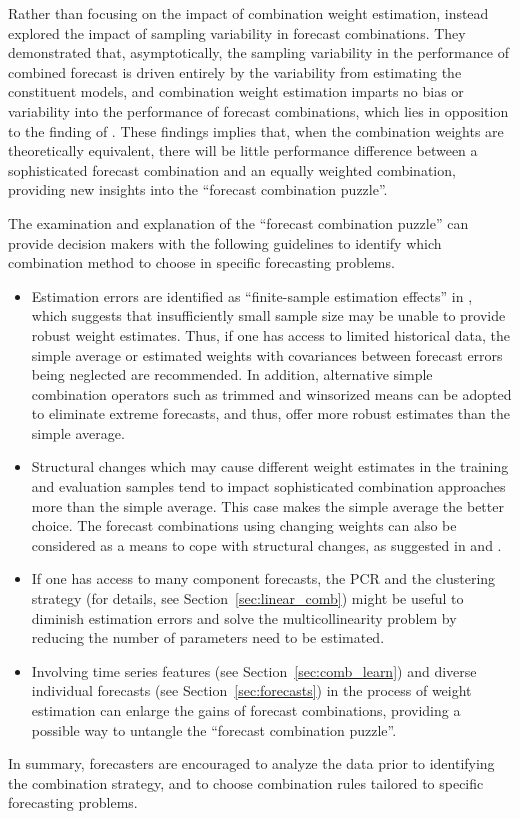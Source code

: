 \documentclass[a4paper,11pt]{article}
\begin{document}
Rather than focusing on the impact of combination weight estimation, \citet{Zischke2022-sv} instead explored the impact of sampling variability in forecast combinations. They demonstrated that, asymptotically, the sampling variability in the performance of combined forecast is driven entirely by the variability from estimating the constituent models, and combination weight estimation imparts no bias or variability into the performance of forecast combinations, which lies in opposition to the finding of \citet{Claeskens2016-pv}. These findings implies that, when the combination weights are theoretically equivalent, there will be little performance difference between a sophisticated forecast combination and an equally weighted combination, providing new insights into the ``forecast combination puzzle''.

The examination and explanation of the ``forecast combination puzzle'' can provide decision makers with the following guidelines to identify which combination method to choose in specific forecasting problems.
\begin{itemize}
  \item Estimation errors are identified as ``finite-sample estimation effects'' in \citet{Smith2009-wd}, which suggests that insufficiently small sample size may be unable to provide robust weight estimates. Thus, if one has access to limited historical data, the simple average or estimated weights with covariances between forecast errors being neglected are recommended. In addition, alternative simple combination operators such as trimmed and winsorized means can be adopted to eliminate extreme forecasts, and thus, offer more robust estimates than the simple average.
  \item Structural changes which may cause different weight estimates in the training and evaluation samples tend to impact sophisticated combination approaches more than the simple average. This case makes the simple average the better choice. The forecast combinations using changing weights can also be considered as a means to cope with structural changes, as suggested in \citet{Diebold1987-go} and \citet{Deutsch1994-ob}.
  \item If one has access to many component forecasts, the PCR and the clustering strategy (for details, see Section~\ref{sec:linear_comb}) might be useful to diminish estimation errors and solve the multicollinearity problem by reducing the number of parameters need to be estimated.
  \item Involving time series features (see Section~\ref{sec:comb_learn}) and diverse individual forecasts (see Section~\ref{sec:forecasts}) in the process of weight estimation can enlarge the gains of forecast combinations, providing a possible way to untangle the ``forecast combination puzzle''.
\end{itemize}
In summary, forecasters are encouraged to analyze the data prior to identifying the combination strategy, and to choose combination rules tailored to specific forecasting problems.
\end{document}
